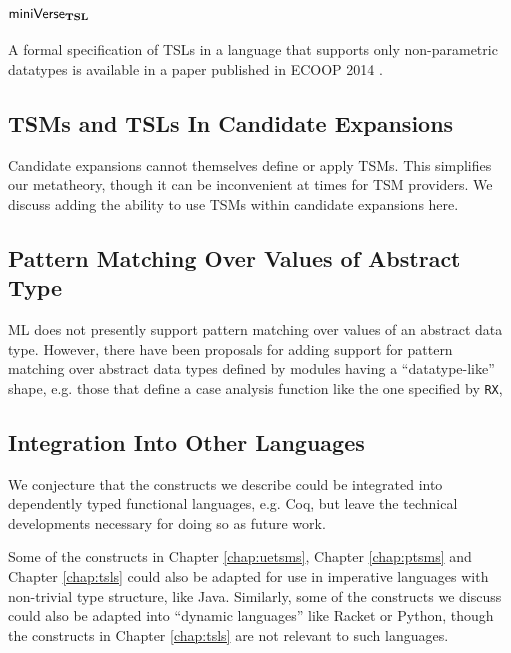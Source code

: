 \section{\texorpdfstring{$\mathsf{miniVerse}_\textbf{TSL}$}{miniVerseTSL}}
A formal specification of TSLs in a language that supports only non-parametric datatypes is available in a paper published in ECOOP 2014 \cite{TSLs}. %

\subsection{TSMs and TSLs In Candidate Expansions}\label{sec:tsms-in-expansions}


Candidate expansions cannot themselves define or apply TSMs. This simplifies our metatheory, though it can be inconvenient at times for TSM providers. We discuss adding the ability to use TSMs within candidate expansions here.

\subsection{Pattern Matching Over Values of Abstract Type}\label{sec:patterns-for-abstract-types}
ML does not presently support pattern matching over values of an abstract data type. However, there have been proposals for adding support for pattern matching over abstract data types defined by modules having a ``datatype-like'' shape, e.g. those that define a case analysis function like the one specified by \lstinline{RX}, %


\subsection{Integration Into Other Languages}\label{sec:integration}
We conjecture that the constructs we describe could be integrated into dependently typed functional languages, e.g. Coq, but leave the technical developments necessary for doing so as future work.

Some of the constructs in Chapter \ref{chap:uetsms}, Chapter \ref{chap:ptsms} and Chapter \ref{chap:tsls} could also be adapted for use in imperative languages with non-trivial type structure, like Java. Similarly, some of the constructs we discuss could also be adapted into ``{dynamic languages}'' like Racket or Python, though the constructs in Chapter \ref{chap:tsls} are not relevant to such languages. 


